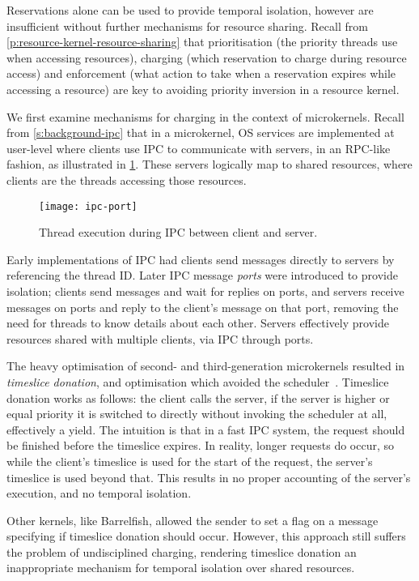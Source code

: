 Reservations alone can be used to provide temporal isolation, however are insufficient without
further mechanisms for resource sharing. Recall from \cref{p:resource-kernel-resource-sharing} that
prioritisation (the priority threads use when accessing resources), charging (which reservation to
charge during resource access) and enforcement (what action to take when a reservation expires while
accessing a resource) are key to avoiding priority inversion in a resource kernel.

We first examine mechanisms for charging in the context of microkernels.
Recall from \cref{s:background-ipc} that in a microkernel, \gls{OS} services are implemented at
user-level where clients use \gls{IPC} to communicate with servers, in an RPC-like fashion, as
illustrated in \cref{f:os-ipc}. These servers logically map to shared resources, where clients are
the threads accessing those resources.

\begin{figure}
    \centering
    \texttt{[image: ipc-port]}
    \caption[Thread execution during IPC.]{Thread execution during IPC between client and server.}
    \label{f:os-ipc}
\end{figure}

Early implementations of IPC had clients send messages directly to servers by referencing the
thread ID. Later IPC message \emph{ports} were introduced to provide isolation; clients send
messages and wait for replies on ports, and servers receive messages on ports and reply to the
client's message on that port, removing the need for threads to know details about each other. 
Servers effectively provide resources shared with multiple clients, via IPC through ports. 

The heavy optimisation of second- and third-generation microkernels resulted in \emph{timeslice
donation}, and optimisation which avoided the scheduler~\citep{Heiser_Elphinstone_16}. 
Timeslice donation works as follows: the client calls the server, if the server is higher or equal
priority it is switched to directly without invoking the scheduler at all, effectively a yield.
The intuition is that in
a fast IPC system, the request should be finished before the timeslice expires. In reality, longer
requests do occur, so while the client's timeslice is used for the start of the request, the server's
timeslice is used beyond that. This results in no
proper accounting of the server's execution, and no temporal isolation.

Other kernels, like Barrelfish, allowed the sender to set a flag on a message specifying if
timeslice donation should occur. However, this approach still suffers the problem of undisciplined 
charging, rendering timeslice donation an inappropriate mechanism for temporal isolation over
shared resources.

